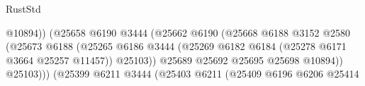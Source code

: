 \begin{lexlean}{RustStd}
\begin{coremodule}
                                                          @10894))
                                                      (@25658
                                                        @6190
                                                        @3444
                                                        (@25662
                                                          @6190
                                                          (@25668
                                                            @6188
                                                            @3152
                                                            @2580
                                                            (@25673
                                                              @6188
                                                              (@25265
                                                                @6186
                                                                @3444
                                                                (@25269
                                                                  @6182
                                                                  @6184
                                                                  (@25278
                                                                    @6171
                                                                    @3664
                                                                    @25257
                                                                    @11457))
                                                                @25103))
                                                            @25689
                                                            @25692
                                                            @25695
                                                            @25698
                                                            @10894))
                                                        @25103)))
                                                  (@25399
                                                    @6211
                                                    @3444
                                                    (@25403
                                                      @6211
                                                      (@25409
                                                        @6196
                                                        @6206
                                                        @25414

\end{coremodule}
\end{lexlean}
